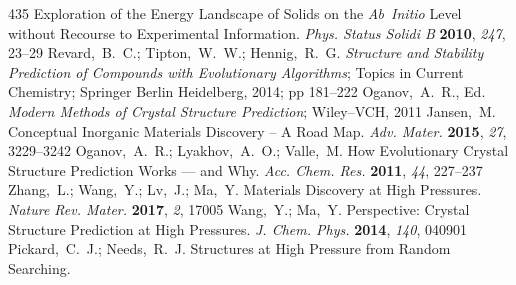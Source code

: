 \documentclass[12pt,letterpaper,oneside]{article}
\begin{document}
\begin{mcitethebibliography}{435}
  Exploration of the Energy Landscape of Solids on the \emph{Ab~Initio} Level
  without Recourse to Experimental Information. \emph{Phys. Status Solidi B}
  \textbf{2010}, \emph{247}, 23--29\relax
\mciteBstWouldAddEndPuncttrue
\mciteSetBstMidEndSepPunct{\mcitedefaultmidpunct}
{\mcitedefaultendpunct}{\mcitedefaultseppunct}\relax
\EndOfBibitem
{}
Revard,~B.~C.; Tipton,~W.~W.; Hennig,~R.~G. \emph{Structure and Stability
  Prediction of Compounds with Evolutionary Algorithms}; Topics in Current
  Chemistry; Springer Berlin Heidelberg, 2014; pp 181--222\relax
\mciteBstWouldAddEndPuncttrue
\mciteSetBstMidEndSepPunct{\mcitedefaultmidpunct}
{\mcitedefaultendpunct}{\mcitedefaultseppunct}\relax
\EndOfBibitem
{}
Oganov,~A.~R., Ed. \emph{Modern Methods of Crystal Structure Prediction};
  Wiley--VCH, 2011\relax
\mciteBstWouldAddEndPuncttrue
\mciteSetBstMidEndSepPunct{\mcitedefaultmidpunct}
{\mcitedefaultendpunct}{\mcitedefaultseppunct}\relax
\EndOfBibitem
{}
Jansen,~M. Conceptual Inorganic Materials Discovery -- A Road Map. \emph{Adv.
  Mater.} \textbf{2015}, \emph{27}, 3229--3242\relax
\mciteBstWouldAddEndPuncttrue
\mciteSetBstMidEndSepPunct{\mcitedefaultmidpunct}
{\mcitedefaultendpunct}{\mcitedefaultseppunct}\relax
\EndOfBibitem
{}
Oganov,~A.~R.; Lyakhov,~A.~O.; Valle,~M. How Evolutionary Crystal Structure
  Prediction Works --- and Why. \emph{Acc. Chem. Res.} \textbf{2011},
  \emph{44}, 227--237\relax
\mciteBstWouldAddEndPuncttrue
\mciteSetBstMidEndSepPunct{\mcitedefaultmidpunct}
{\mcitedefaultendpunct}{\mcitedefaultseppunct}\relax
\EndOfBibitem
{}
Zhang,~L.; Wang,~Y.; Lv,~J.; Ma,~Y. Materials Discovery at High Pressures.
  \emph{Nature Rev. Mater.} \textbf{2017}, \emph{2}, 17005\relax
\mciteBstWouldAddEndPuncttrue
\mciteSetBstMidEndSepPunct{\mcitedefaultmidpunct}
{\mcitedefaultendpunct}{\mcitedefaultseppunct}\relax
\EndOfBibitem
{}
Wang,~Y.; Ma,~Y. Perspective: Crystal Structure Prediction at High Pressures.
  \emph{J. Chem. Phys.} \textbf{2014}, \emph{140}, 040901\relax
\mciteBstWouldAddEndPuncttrue
\mciteSetBstMidEndSepPunct{\mcitedefaultmidpunct}
{\mcitedefaultendpunct}{\mcitedefaultseppunct}\relax
\EndOfBibitem
{}
Pickard,~C.~J.; Needs,~R.~J. Structures at High Pressure from Random Searching.

\end{mcitethebibliography}
\end{document}
